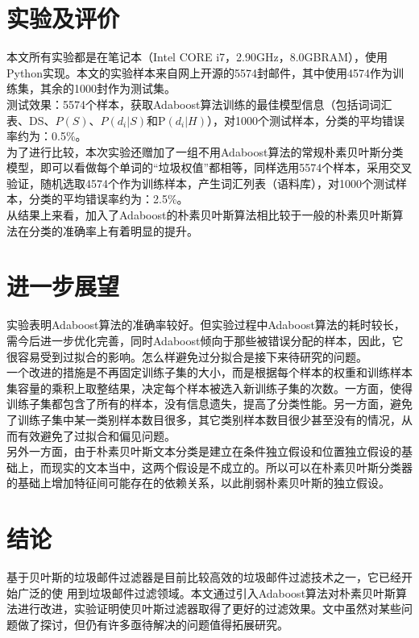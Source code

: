 \documentclass[a4paper,11pt,onecolumn,twoside]{article}
\makeatletter
\newenvironment{figurehere}
  {\def\@captype{figure}}
  {}
\makeatother
\begin{document}
\begin{multicols}{2}
\section{实验及评价}
本文所有实验都是在笔记本（Intel CORE i7，2.90GHz，8.0GBRAM），使用Python实现。本文的实验样本来自网上开源的5574封邮件，其中使用4574作为训练集，其余的1000封作为测试集。\\
\indent 测试效果：5574个样本，获取Adaboost算法训练的最佳模型信息（包括词词汇表、DS、$P(S)$、$P(d_i|S)$和P$(d_i|H)$），对1000个测试样本，分类的平均错误率约为：0.5\%。\\
\indent 为了进行比较，本次实验还赠加了一组不用Adaboost算法的常规朴素贝叶斯分类模型，即可以看做每个单词的“垃圾权值”都相等，同样选用5574个样本，采用交叉验证，随机选取4574个作为训练样本，产生词汇列表（语料库），对1000个测试样本，分类的平均错误率约为：2.5\%。\\
\indent 从结果上来看，加入了Adaboost的朴素贝叶斯算法相比较于一般的朴素贝叶斯算法在分类的准确率上有着明显的提升。
\section{进一步展望}
实验表明Adaboost算法的准确率较好。但实验过程中Adaboost算法的耗时较长，需今后进一步优化完善，同时Adaboost倾向于那些被错误分配的样本，因此，它很容易受到过拟合的影响。怎么样避免过分拟合是接下来待研究的问题。\\
\indent 一个改进的措施\cite{Lu}是不再固定训练子集的大小，而是根据每个样本的权重和训练样本集容量的乘积上取整结果，决定每个样本被选入新训练子集的次数。一方面，使得训练子集都包含了所有的样本，没有信息遗失，提高了分类性能。另一方面，避免了训练子集中某一类别样本数目很多，其它类别样本数目很少甚至没有的情况，从而有效避免了过拟合和偏见问题。\\
\indent 另外一方面，由于朴素贝叶斯文本分类是建立在条件独立假设和位置独立假设的基础上，而现实的文本当中，这两个假设是不成立的。所以可以在朴素贝叶斯分类器的基础上增加特征间可能存在的依赖关系，以此削弱朴素贝叶斯的独立假设。
\section{结论}
基于贝叶斯的垃圾邮件过滤器是目前比较高效的垃圾邮件过滤技术之一，它已经开始广泛的使 用到垃圾邮件过滤领域。本文通过引入Adaboost算法对朴素贝叶斯算法进行改进，实验证明使贝叶斯过滤器取得了更好的过滤效果。文中虽然对某些问题做了探讨，但仍有许多亟待解决的问题值得拓展研究。


\end{multicols}
\end{document}
